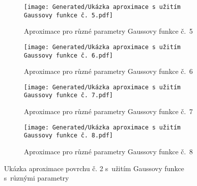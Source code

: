 \begin{landscapeimagepage}
    \vspace*{\fill}
    \begin{figure}[H]
        \centering
        \begin{subfigure}{.5\textheight}
            \centering
            \texttt{[image: Generated/Ukázka aproximace s užitím Gaussovy funkce č. 5.pdf]}
            \caption{Aproximace pro různé parametry Gaussovy funkce č.~5}
            \label{fig:Ukázka aproximace povrchu s~užitím Gaussovy funkce č. 5}
        \end{subfigure}
        \vspace{0.5cm}
        \hspace{2.5cm}
        \begin{subfigure}{.5\textheight}
            \centering
            \texttt{[image: Generated/Ukázka aproximace s užitím Gaussovy funkce č. 6.pdf]}
            \caption{Aproximace pro různé parametry Gaussovy funkce č.~6}
            \label{fig:Ukázka aproximace povrchu s~užitím Gaussovy funkce č. 6}
        \end{subfigure}
        \vspace{0.5cm}
        \begin{subfigure}{.5\textheight}
            \centering
            \texttt{[image: Generated/Ukázka aproximace s užitím Gaussovy funkce č. 7.pdf]}
            \caption{Aproximace pro různé parametry Gaussovy funkce č.~7}
            \label{fig:Ukázka aproximace povrchu s~užitím Gaussovy funkce č. 7}
        \end{subfigure}
        \hspace{2.5cm}
        \begin{subfigure}{.5\textheight}
            \centering
            \texttt{[image: Generated/Ukázka aproximace s užitím Gaussovy funkce č. 8.pdf]}
            \caption{Aproximace pro různé parametry Gaussovy funkce č.~8}
            \label{fig:Ukázka aproximace povrchu s~užitím Gaussovy funkce č. 8}
        \end{subfigure}
        \caption{Ukázka aproximace povrchu č. 2 s~užitím Gaussovy funkce s~různými parametry}
        \label{fig:Ukázka aproximace povrchu č. 2 s~užitím Gaussovy funkce s~různými parametry}
    \end{figure}
    \vspace*{\fill}
\end{landscapeimagepage}